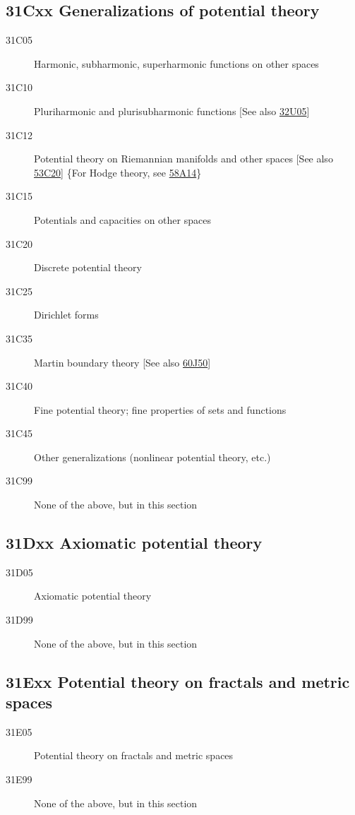 \documentclass[letterpaper]{article}
\begin{document}
\subsection*{31Cxx  Generalizations of potential theory }\label{31Cxx}
\begin{description}  
\item [31C05]\label{31C05} Harmonic, subharmonic, superharmonic functions on other spaces
\item [31C10]\label{31C10} Pluriharmonic and plurisubharmonic functions [See also \hyperref[32U05]{32U05}]
\item [31C12]\label{31C12} Potential theory on Riemannian manifolds and other spaces [See also \hyperref[53C20]{53C20}] \{For Hodge theory, see \hyperref[58A14]{58A14}\}
\item [31C15]\label{31C15} Potentials and capacities on other spaces
\item [31C20]\label{31C20} Discrete potential theory
\item [31C25]\label{31C25} Dirichlet forms
\item [31C35]\label{31C35} Martin boundary theory [See also \hyperref[60J50]{60J50}]
\item [31C40]\label{31C40} Fine potential theory; fine properties of sets and functions
\item [31C45]\label{31C45} Other generalizations (nonlinear potential theory, etc.)
\item [31C99]\label{31C99} None of the above, but in this section
\end{description}
\subsection*{31Dxx  Axiomatic potential theory }\label{31Dxx}
\begin{description}  
\item [31D05]\label{31D05} Axiomatic potential theory
\item [31D99]\label{31D99} None of the above, but in this section
\end{description}
\subsection*{31Exx  Potential theory on fractals and metric spaces }\label{31Exx}
\begin{description}  
\item [31E05]\label{31E05} Potential theory on fractals and metric spaces
\item [31E99]\label{31E99} None of the above, but in this section
\end{description}
\end{document}
